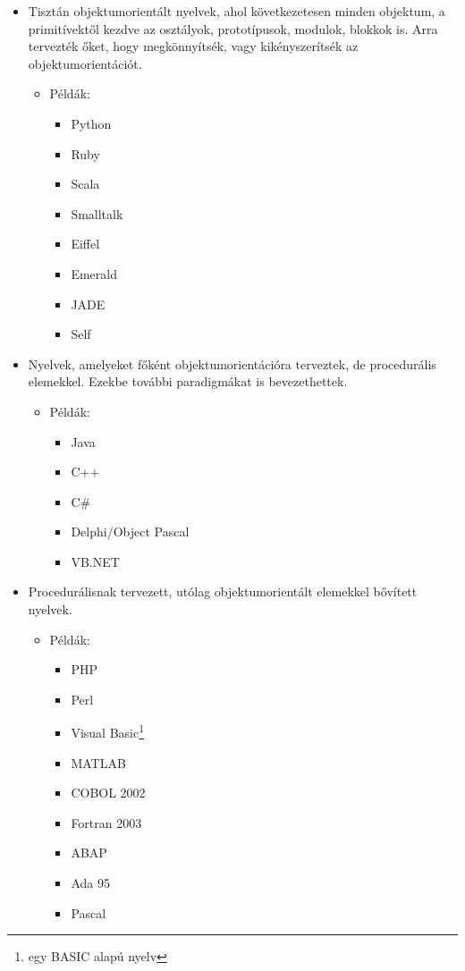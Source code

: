 \documentclass[]{thesis-ekf}
\theoremstyle{definition}
\begin{document}
	\begin{itemize}
		\item Tisztán objektumorientált nyelvek, ahol következetesen minden objektum, a primitívektől kezdve az osztályok, prototípusok, modulok, blokkok is. Arra tervezték őket, hogy megkönnyítsék, vagy kikényszerítsék az objektumorientációt.
		\begin{itemize}
			\item Példák: 
			\begin{itemize}
				\item Python
				\item Ruby
				\item Scala
				\item Smalltalk
				\item Eiffel
				\item Emerald
				\item JADE
				\item Self
			\end{itemize}
		\end{itemize}
		
		\item Nyelvek, amelyeket főként objektumorientációra terveztek, de procedurális elemekkel. Ezekbe további paradigmákat is bevezethettek.
		\begin{itemize}
			\item Példák: 
			\begin{itemize}
				\item Java
				\item C++
				\item C\#
				\item Delphi/Object Pascal
				\item VB.NET
			\end{itemize}
		\end{itemize}
		
		\item Procedurálisnak tervezett, utólag objektumorientált elemekkel bővített nyelvek.
		\begin{itemize}
			\item Példák: 
			\begin{itemize}
				\item PHP
				\item Perl
				\item Visual Basic\footnote{egy BASIC alapú nyelv}
				\item MATLAB
				\item COBOL 2002
				\item Fortran 2003
				\item ABAP
				\item Ada 95
				\item Pascal
			\end{itemize}
		\end{itemize}
		

\end{itemize}
\end{document}
